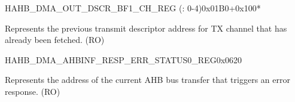 \begin{register}{H}{AHB\_DMA\_OUT\_DSCR\_BF1\_CH\_REG (: 0-4)}{0x01B0+0x100*}\label{regdesc:AHBDMAOUTDSCRBF1CHNREG}
%
\regnewline%
\begin{regdesc}\begin{reglist}
\label{fielddesc:AHBDMAOUTLINKDSCRBF1CHN}\item [AHB\_DMA\_OUTLINK\_DSCR\_BF1\_CH\regindex{n}] Represents the previous transmit descriptor address for TX channel  that has already been fetched. (RO)
\end{reglist}\end{regdesc}
\end{register}


\begin{register}{H}{AHB\_DMA\_AHBINF\_RESP\_ERR\_STATUS0\_REG}{0x0620}\label{regdesc:AHBDMAAHBINFRESPERRSTATUS0REG}
%
\regnewline%
\begin{regdesc}\begin{reglist}
\label{fielddesc:AHBDMAAHBINFRESPERRADDR}\item [AHB\_DMA\_AHBINF\_RESP\_ERR\_ADDR] Represents the address of the current AHB bus transfer that triggers an error response. (RO)
\end{reglist}\end{regdesc}
\end{register}


